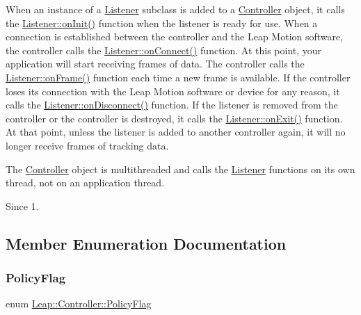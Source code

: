 When an instance of a \hyperlink{class_leap_1_1_listener}{Listener} subclass is added to a \hyperlink{class_leap_1_1_controller}{Controller} object, it calls the \hyperlink{class_leap_1_1_listener_a180d621ad08afa5851d03d3546a82bbf}{Listener\+::on\+Init()} function when the listener is ready for use. When a connection is established between the controller and the Leap Motion software, the controller calls the \hyperlink{class_leap_1_1_listener_adfef79f9a03b342384aaa17f3a8ebf15}{Listener\+::on\+Connect()} function. At this point, your application will start receiving frames of data. The controller calls the \hyperlink{class_leap_1_1_listener_ab600421108bbc952d8f0f144384ca30f}{Listener\+::on\+Frame()} function each time a new frame is available. If the controller loses its connection with the Leap Motion software or device for any reason, it calls the \hyperlink{class_leap_1_1_listener_ac031e2d95b530097e2060518a9190f5e}{Listener\+::on\+Disconnect()} function. If the listener is removed from the controller or the controller is destroyed, it calls the \hyperlink{class_leap_1_1_listener_ac8f779a9208101f0084953560923f88c}{Listener\+::on\+Exit()} function. At that point, unless the listener is added to another controller again, it will no longer receive frames of tracking data.

The \hyperlink{class_leap_1_1_controller}{Controller} object is multithreaded and calls the \hyperlink{class_leap_1_1_listener}{Listener} functions on its own thread, not on an application thread. \begin{DoxySince}{Since}
1. 
\end{DoxySince}


\subsection{Member Enumeration Documentation}
\mbox{\label{class_leap_1_1_controller_a0bdb49fa94aa2da8b098c1ac296528d6}} 
\subsubsection{\texorpdfstring{Policy\+Flag}{PolicyFlag}}
{\footnotesize\ttfamily enum \hyperlink{class_leap_1_1_controller_a0bdb49fa94aa2da8b098c1ac296528d6}{Leap\+::\+Controller\+::\+Policy\+Flag}}

